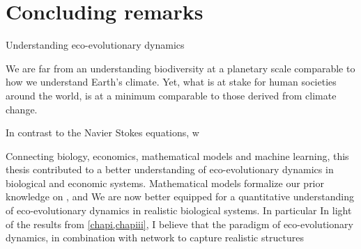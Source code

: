% 



\section{Concluding remarks}

Understanding eco-evolutionary dynamics




We are far from an understanding biodiversity at a planetary scale comparable to how we understand Earth’s climate. Yet, what is at stake for human societies around the world, is at a minimum comparable to those derived from climate change.


In contrast to the Navier Stokes equations, w

Connecting biology, economics, mathematical models and machine learning, this thesis contributed to a better understanding of eco-evolutionary dynamics in biological and economic systems.
% 
Mathematical models formalize our prior knowledge on , and 
% 
We are now better equipped for a quantitative understanding of eco-evolutionary dynamics in realistic biological systems. In particular
% 
In light of the results from \cref{chapi,chapiii}, I believe that the paradigm of eco-evolutionary dynamics, in combination with network to capture realistic structures 


% 
% 
% 




